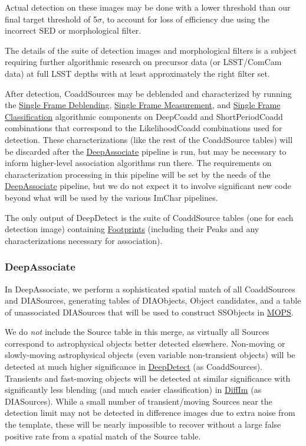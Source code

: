 Actual detection on these images may be done with a lower threshold than our final target threshold of 5$\sigma$, to account for loss of efficiency due using the incorrect SED or morphological filter.

The details of the suite of detection images and morphological filters is a subject requiring further algorithmic research on precursor data (or LSST/ComCam data) at full LSST depths with at least approximately the right filter set.

After detection, CoaddSources may be deblended and characterized by running the \hyperref[sec:acSingleFrameDeblending]{Single Frame Deblending}, \hyperref[sec:acSingleFrameMeasurement]{Single Frame Measurement}, and \hyperref[sec:acSingleFrameClassification]{Single Frame Classification} algorithmic components on DeepCoadd and ShortPeriodCoadd combinations that correspond to the LikelihoodCoadd combinations used for detection.  These characterizations (like the rest of the CoaddSource tables) will be discarded after the \hyperref[sec:drpDeepAssociate]{DeepAssociate} pipeline is run, but may be necessary to inform higher-level association algorithms run there.  The requirements on characterization processing in this pipeline will be set by the needs of the \hyperref[sec:drpDeepAssociate]{DeepAssociate} pipeline, but we do not expect it to involve significant new code beyond what will be used by the various ImChar pipelines.

The only output of DeepDetect is the suite of CoaddSource tables (one for each detection image) containing \hyperref[sec:spFootprints]{Footprints} (including their Peaks and any characterizations necessary for association).

\subsubsection{DeepAssociate}
\label{sec:drpDeepAssociate}

In DeepAssociate, we perform a sophisticated spatial match of all CoaddSources and DIASources, generating tables of DIAObjects, Object candidates, and a table of unassociated DIASources that will be used to construct SSObjects in \hyperref[sec:drpMOPS]{MOPS}.

We do \emph{not} include the Source table in this merge, as virtually all Sources correspond to astrophysical objects better detected elsewhere.  Non-moving or slowly-moving astrophysical objects (even variable non-transient objects) will be detected at much higher significance in \hyperref[sec:drpDeepDetect]{DeepDetect} (as CoaddSources).  Transients and fast-moving objects will be detected at similar significance with significantly less blending (and much easier classification) in \hyperref[sec:drpDiffIm]{DiffIm} (as DIASources).  While a small number of transient/moving Sources near the detection limit may not be detected in difference images due to extra noise from the template, these will be nearly impossible to recover without a large false positive rate from a spatial match of the Source table.

